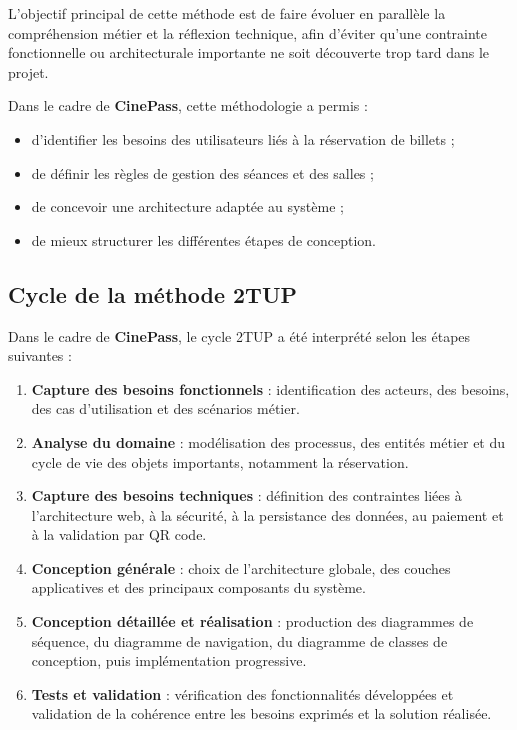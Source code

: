 \documentclass[12pt]{report}
\begin{document}
L’objectif principal de cette méthode est de faire évoluer en parallèle la
compréhension métier et la réflexion technique, afin d’éviter qu’une contrainte
fonctionnelle ou architecturale importante ne soit découverte trop tard dans le
projet.

Dans le cadre de \textbf{CinePass}, cette méthodologie a permis :

\begin{itemize}
    \item d’identifier les besoins des utilisateurs liés à la réservation de billets ;
    \item de définir les règles de gestion des séances et des salles ;
    \item de concevoir une architecture adaptée au système ;
    \item de mieux structurer les différentes étapes de conception.
\end{itemize}

\subsection{Cycle de la méthode 2TUP}

Dans le cadre de \textbf{CinePass}, le cycle 2TUP a été interprété selon les
étapes suivantes :

\begin{enumerate}
    \item \textbf{Capture des besoins fonctionnels} : identification des acteurs,
          des besoins, des cas d’utilisation et des scénarios métier.
    \item \textbf{Analyse du domaine} : modélisation des processus, des entités
          métier et du cycle de vie des objets importants, notamment la
          réservation.
    \item \textbf{Capture des besoins techniques} : définition des contraintes
          liées à l’architecture web, à la sécurité, à la persistance des
          données, au paiement et à la validation par QR code.
    \item \textbf{Conception générale} : choix de l’architecture globale, des
          couches applicatives et des principaux composants du système.
    \item \textbf{Conception détaillée et réalisation} : production des
          diagrammes de séquence, du diagramme de navigation, du diagramme de
          classes de conception, puis implémentation progressive.
    \item \textbf{Tests et validation} : vérification des fonctionnalités
          développées et validation de la cohérence entre les besoins exprimés et
          la solution réalisée.
\end{enumerate}
\end{document}
